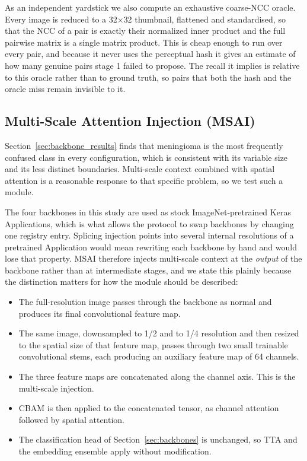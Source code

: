 \documentclass[11pt]{article}
\begin{document}
As an independent yardstick we also compute an exhaustive coarse-NCC oracle. Every image is reduced to a 32$\times$32 thumbnail, flattened and standardised, so that the NCC of a pair is exactly their normalized inner product and the full pairwise matrix is a single matrix product. This is cheap enough to run over every pair, and because it never uses the perceptual hash it gives an estimate of how many genuine pairs stage 1 failed to propose. The recall it implies is relative to this oracle rather than to ground truth, so pairs that both the hash and the oracle miss remain invisible to it.

\subsection{Multi-Scale Attention Injection (MSAI)}
\label{sec:msai_method}
Section~\ref{sec:backbone_results} finds that meningioma is the most frequently confused class in every configuration, which is consistent with its variable size and its less distinct boundaries. Multi-scale context combined with spatial attention is a reasonable response to that specific problem, so we test such a module.

The four backbones in this study are used as stock ImageNet-pretrained Keras Applications, which is what allows the protocol to swap backbones by changing one registry entry. Splicing injection points into several internal resolutions of a pretrained Application would mean rewriting each backbone by hand and would lose that property. MSAI therefore injects multi-scale context at the \emph{output} of the backbone rather than at intermediate stages, and we state this plainly because the distinction matters for how the module should be described:

\begin{itemize}
    \item The full-resolution image passes through the backbone as normal and produces its final convolutional feature map.
    \item The same image, downsampled to 1/2 and to 1/4 resolution and then resized to the spatial size of that feature map, passes through two small trainable convolutional stems, each producing an auxiliary feature map of 64 channels.
    \item The three feature maps are concatenated along the channel axis. This is the multi-scale injection.
    \item CBAM \cite{woo2018cbam} is then applied to the concatenated tensor, as channel attention followed by spatial attention.
    \item The classification head of Section~\ref{sec:backbones} is unchanged, so TTA and the embedding ensemble apply without modification.
\end{itemize}
\end{document}
